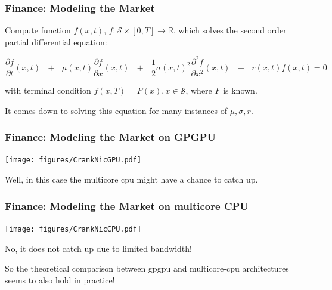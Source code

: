 \documentclass{beamer}
\renewcommand{\emph}[1]{\textcolor{structure}{#1}}
\newcommand{\emp}[1]{\textcolor{DikuRed}{ #1}}
\begin{document}
\begin{frame}[fragile,t]
\frametitle{Finance: Modeling the Market}

\bigskip

Compute function $f(x,t)$, $f : \mathcal{S} \times [0, T] \rightarrow \mathbb{R}$, 
which solves the second order partial differential equation:

\bigskip

\begin{equation}
\frac{\partial f}{\partial t}(x,t)\mbox{ }+\mbox{ }\mu(x,t)\frac{\partial f}{\partial x}(x,t)\mbox{ }+\mbox{ }
\frac{1}{2}\sigma(x,t)^{2}\frac{\partial^{2} f}{\partial x^{2}}(x,t)\mbox{ }-\mbox{ }
r(x,t)f(x,t) = 0
\end{equation}

\bigskip

with terminal condition $f(x, T) = F(x), x \in \mathcal{S}$, where $F$ is known.

\bigskip
\bigskip
\bigskip

\emp{It comes down to solving this equation for many instances of $\mu, \sigma, r$.}


\end{frame}


\begin{frame}[fragile,t]
\frametitle{Finance: Modeling the Market on GPGPU}

\smallskip
\begin{center} 
\texttt{[image: figures/CrankNicGPU.pdf]} 
\end{center} 
\smallskip

Well, in this case the multicore {\sc cpu} might have a chance to catch up.

\end{frame}

\begin{frame}[fragile,t]
\frametitle{Finance: Modeling the Market on multicore CPU}

\smallskip
\begin{center} 
\texttt{[image: figures/CrankNicCPU.pdf]} 
\end{center} 
\smallskip

No, it does not catch up due to limited bandwidth!

\bigskip

\emph{So the theoretical comparison between {\sc gpgpu} and multicore-{\sc cpu} architectures seems to also hold in practice!}

\end{frame}
\end{document}
